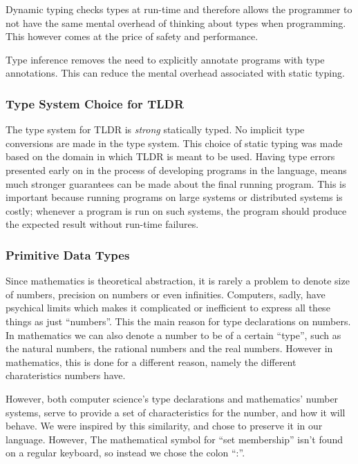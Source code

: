 Dynamic typing checks types at run-time and therefore allows the programmer to not have the same mental overhead of thinking about types when programming.  This however comes at the price of safety and performance.

Type inference removes the need to explicitly annotate programs with type annotations. This can reduce the mental overhead associated with static typing.

\subsubsection{Type System Choice for TLDR}

The type system for TLDR is \emph{strong} statically typed. No implicit type conversions are made in the type system. This choice of static typing was made based on the domain in which TLDR is meant to be used. Having type errors presented early on in the process of developing programs in the language, means much stronger guarantees can be made about the final running program. This is important because running programs on large systems or distributed systems is costly; whenever a program is run on such systems, the program should produce the expected result without run-time failures.

\subsubsection{Primitive Data Types}
\label{subsec:primitives}

Since mathematics is theoretical abstraction, it is rarely a problem to denote size of numbers, precision on numbers or even infinities. Computers, sadly, have psychical limits which makes it complicated or inefficient to express all these things as just \enquote{numbers}. This the main reason for type declarations on numbers. In mathematics we can also denote a number to be of a certain \enquote{type}, such as the natural numbers, the rational numbers and the real numbers. However in mathematics, this is done for a different reason, namely the different charateristics numbers have.

However, both computer science's type declarations and mathematics' number systems, serve to provide a set of characteristics for the number, and how it will behave. We were inspired by this similarity, and chose to preserve it in our language. However, The mathematical symbol for \enquote{set membership} isn't found on a regular keyboard, so instead we chose the colon \enquote{:}.

